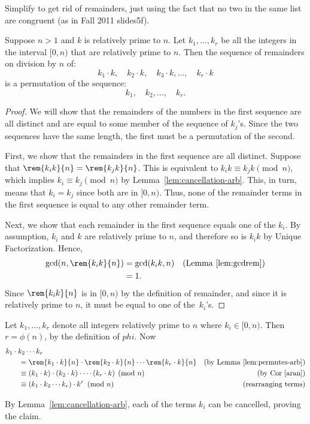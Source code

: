 \begin{editingnotes}

Simplify to get rid of remainders, just using the fact that no two in
the same list are congruent (as in Fall 2011 slides5f).

\begin{lemma} \label{lem:permutes-arb}
Suppose $n>1$ and $k$ is relatively prime to $n$.
Let $k_1, \dots, k_r$ be all the integers in the interval
$[0,n)$ that are relatively prime to $n$.  Then the sequence of
  remainders on division by $n$ of:
\[
k_1 \cdot k,\quad
k_2 \cdot k,\quad
k_3 \cdot k, \dots,\quad
k_r \cdot k
\]
is a permutation of the sequence:
\[
k_1,\quad k_2, \dots,\quad k_r.
\]
\end{lemma}

\begin{proof}
We will show that the remainders of the numbers in the first sequence
are all distinct and are equal to some member of the sequence of
$k_j$'s.  Since the two sequences have the same length, the first must
be a permutation of the second.

First, we show that the remainders in the first sequence are all
distinct.  Suppose that $\rem{k_i k}{n} = \rem{k_j k}{n}$.  This is
equivalent to $k_i k \equiv k_j k \pmod{n}$, which implies $k_i \equiv
k_j \pmod{n}$ by Lemma~\ref{lem:cancellation-arb}.  This, in turn,
means that $k_i = k_j$ since both are in $[0,n)$.  Thus, none
of the remainder terms in the first sequence is equal to any other
remainder term.

Next, we show that each remainder in the first sequence equals one of
the $k_i$.  By assumption, $k_i$ and $k$ are relatively prime to $n$,
and therefore so is $k_ik$ by Unique Factorization.  Hence,
\begin{align*}
\gcd(n, \rem{k_i k}{n}) & = \gcd(k_i k, n)
            & \text{(Lemma~\ref{lem:gcdrem})}\\
      & = 1.
\end{align*}
Since $\rem{k_i k}{n}$ is in $[0, n)$ by the definition of remainder,
  and since it is relatively prime to $n$, it must be equal to one of
  the~$k_i$'s.
\end{proof}

Let $k_1, \dots, k_r$ denote all integers relatively prime to $n$
where $ k_i\in [0, n)$.  Then $r = \phi(n)$, by the definition of
  $phi$.  Now
\begin{align*}
\lefteqn{k_1 \cdot k_2 \cdots k_r} \hspace{0.25in} \\
  & = \rem{k_1 \cdot k}{n} \cdot \rem{k_2 \cdot k}{n} \cdots \rem{k_r \cdot k}{n}
      & \text{(by Lemma~\ref{lem:permutes-arb})}\\
  & \equiv (k_1 \cdot k) \cdot (k_2 \cdot k) \cdot \cdots (k_r \cdot k) \pmod{n}
      & \text{(by Cor~\ref{aran})}\\
  & \equiv (k_1 \cdot k_2 \cdots k_r) \cdot k^r \pmod{n}
      & \text{(rearranging terms)}
\end{align*}

By Lemma~\ref{lem:cancellation-arb}, each of the terms $k_i$ can be
cancelled, proving the claim.
\end{editingnotes}

